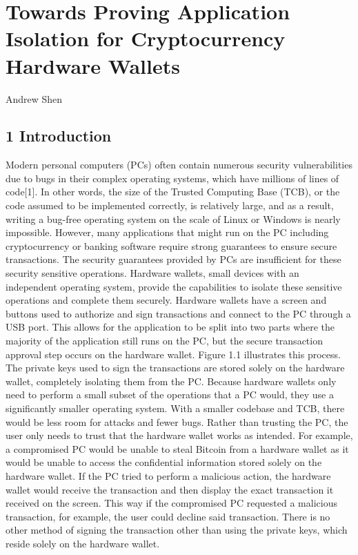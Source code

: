 \documentclass[]{article}
\date{}
\begin{document}
\section{Towards Proving Application Isolation for Cryptocurrency
Hardware
Wallets}\label{towards-proving-application-isolation-for-cryptocurrency-hardware-wallets}

Andrew Shen

\subsection{1 Introduction}\label{introduction}

Modern personal computers (PCs) often contain numerous security
vulnerabilities due to bugs in their complex operating systems, which
have millions of lines of code{[}1{]}. In other words, the size of the
Trusted Computing Base (TCB), or the code assumed to be implemented
correctly, is relatively large, and as a result, writing a bug-free
operating system on the scale of Linux or Windows is nearly impossible.
However, many applications that might run on the PC including
cryptocurrency or banking software require strong guarantees to ensure
secure transactions. The security guarantees provided by PCs are
insufficient for these security sensitive operations. Hardware wallets,
small devices with an independent operating system, provide the
capabilities to isolate these sensitive operations and complete them
securely. Hardware wallets have a screen and buttons used to authorize
and sign transactions and connect to the PC through a USB port. This
allows for the application to be split into two parts where the majority
of the application still runs on the PC, but the secure transaction
approval step occurs on the hardware wallet. Figure 1.1 illustrates this
process. The private keys used to sign the transactions are stored
solely on the hardware wallet, completely isolating them from the PC.
Because hardware wallets only need to perform a small subset of the
operations that a PC would, they use a significantly smaller operating
system. With a smaller codebase and TCB, there would be less room for
attacks and fewer bugs. Rather than trusting the PC, the user only needs
to trust that the hardware wallet works as intended. For example, a
compromised PC would be unable to steal Bitcoin from a hardware wallet
as it would be unable to access the confidential information stored
solely on the hardware wallet. If the PC tried to perform a malicious
action, the hardware wallet would receive the transaction and then
display the exact transaction it received on the screen. This way if the
compromised PC requested a malicious transaction, for example, the user
could decline said transaction. There is no other method of signing the
transaction other than using the private keys, which reside solely on
the hardware wallet.
\end{document}
